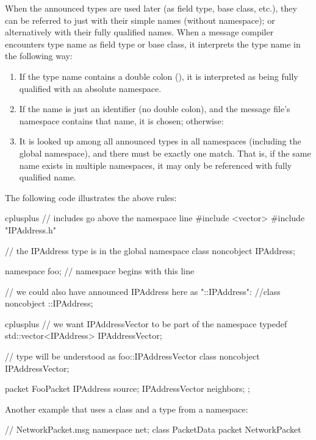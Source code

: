 When the announced types are used later (as field type, base class, etc.),
they can be referred to just with their simple names (without namespace);
or alternatively with their fully qualified names. When a message compiler
encounters type name as field type or base class, it interprets the type
name in the following way:

\begin{enumerate}
\item If the type name contains a double colon (\ttt{::}), it is interpreted
      as being fully qualified with an absolute namespace.
\item If the name is just an identifier (no double colon), and the message
      file's namespace contains that name, it is chosen; otherwise:
\item It is looked up among all announced types in all namespaces (including
      the global namespace), and there must be exactly one match. That is,
      if the same name exists in multiple namespaces, it may only be
      referenced with fully qualified name.
\end{enumerate}

The following code illustrates the above rules:

\begin{msg}
cplusplus {{
// includes go above the namespace line
#include <vector>
#include "IPAddress.h"
}}

// the IPAddress type is in the global namespace
class noncobject IPAddress;

namespace foo;  // namespace begins with this line

// we could also have announced IPAddress here as "::IPAddress":
//class noncobject ::IPAddress;

cplusplus {{
// we want IPAddressVector to be part of the namespace
typedef std::vector<IPAddress> IPAddressVector;
}}

// type will be understood as foo::IPAddressVector
class noncobject IPAddressVector;

packet FooPacket {
    IPAddress source;
    IPAddressVector neighbors;
};
\end{msg}

Another example that uses a  class and a  type
from a  namespace:

\begin{msg}
// NetworkPacket.msg
namespace net;
class PacketData { }
packet NetworkPacket { }
\end{msg}

